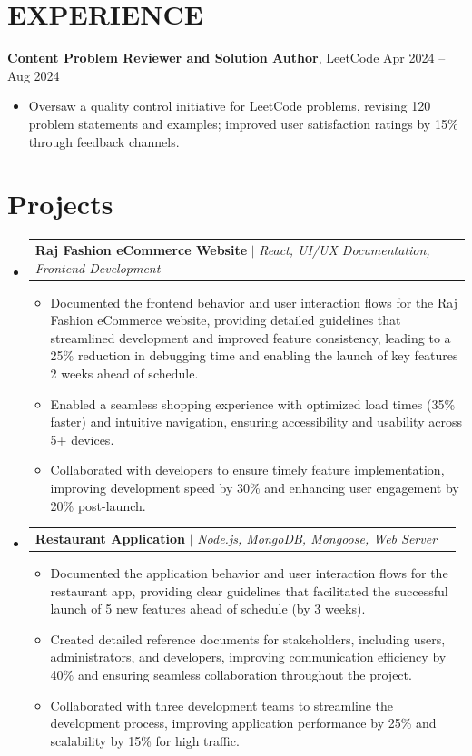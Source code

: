 \documentclass[letterpaper,11pt]{article}
\makeatletter
\newcommand{\resumeItem}[1]{
  \item\small{
    {#1 \vspace{-2pt}}
  }
}
\newcommand{\resumeProjectHeading}[2]{
    \item
    \begin{tabular*}{1.001\textwidth}{l@{\extracolsep{\fill}}r}
      \small#1 & \textbf{\small #2}\\
    \end{tabular*}\vspace{-7pt}
}
\newcommand{\resumeSubHeadingListStart}{\begin{itemize}[leftmargin=0.0in, label={}]}
\newcommand{\resumeSubHeadingListEnd}{\end{itemize}}
\newcommand{\resumeItemListStart}{\begin{itemize}}
\newcommand{\resumeItemListEnd}{\end{itemize}\vspace{-7pt}}
\makeatother
\begin{document}
\section*{EXPERIENCE}
\textbf{Content Problem Reviewer and Solution Author}, LeetCode \hfill Apr 2024 – Aug 2024\\[-0.8em] %
\vspace{-1}
\begin{itemize}\setlength{\itemsep}{0pt} %
    \item Oversaw a quality control initiative for LeetCode problems, revising 120 problem statements and examples; improved user satisfaction ratings by 15\% through feedback channels.
\end{itemize}





\section{Projects}
    \vspace{-5pt}
    \resumeSubHeadingListStart
      \resumeProjectHeading
          {\textbf{Raj Fashion eCommerce Website} $|$ \emph{React, UI/UX Documentation, Frontend Development}}{}
          \resumeItemListStart
       \resumeItem{Documented the frontend behavior and user interaction flows for the Raj Fashion eCommerce website, providing detailed guidelines that streamlined development and improved feature consistency, leading to a 25\% reduction in debugging time and enabling the launch of key features 2 weeks ahead of schedule.}
       \resumeItem{Enabled a seamless shopping experience with optimized load times (35\% faster) and intuitive navigation, ensuring accessibility and usability across 5+ devices.}
       \resumeItem{Collaborated with developers to ensure timely feature implementation, improving development speed by 30\% and enhancing user engagement by 20\% post-launch.}
     \resumeItemListEnd
     \vspace{-15pt} %

      \resumeProjectHeading
          {\textbf{Restaurant Application} $|$ \emph{Node.js, MongoDB, Mongoose, Web Server}}{}
          \resumeItemListStart
       \resumeItem{Documented the application behavior and user interaction flows for the restaurant app, providing clear guidelines that facilitated the successful launch of 5 new features ahead of schedule (by 3 weeks).}
       \resumeItem{Created detailed reference documents for stakeholders, including users, administrators, and developers, improving communication efficiency by 40\% and ensuring seamless collaboration throughout the project.}
       \resumeItem{Collaborated with three development teams to streamline the development process, improving application performance by 25\% and scalability by 15\% for high traffic.}
     \resumeItemListEnd
    \resumeSubHeadingListEnd
\end{document}
